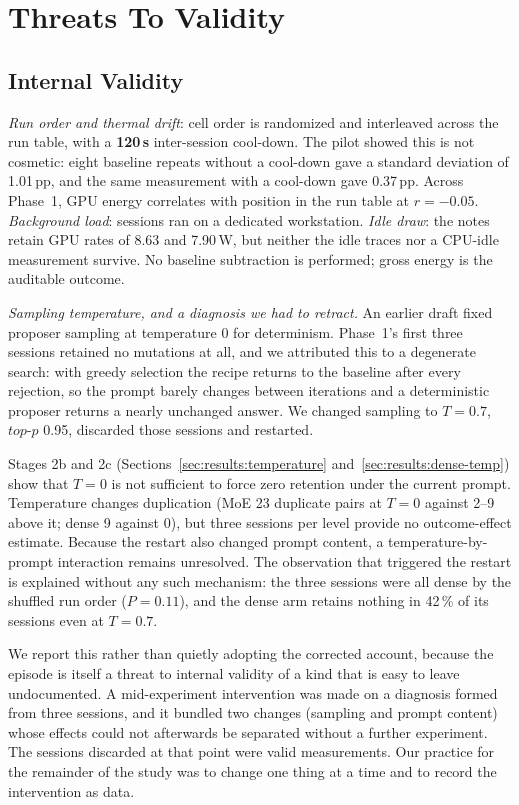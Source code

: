 \section{Threats To Validity}\label{sec:threats}

\subsection{Internal Validity}
\emph{Run order and thermal drift}: cell order is randomized and interleaved across the run table, with a \textbf{120\,s} inter-session cool-down. The pilot showed this is not cosmetic: eight baseline repeats without a cool-down gave a standard deviation of 1.01\,pp, and the same measurement with a cool-down gave 0.37\,pp. Across Phase~1, GPU energy correlates with position in the run table at $r=-0.05$. \emph{Background load}: sessions ran on a dedicated workstation. \emph{Idle draw}: the notes retain GPU rates of 8.63 and 7.90\,W, but neither the idle traces nor a CPU-idle measurement survive. No baseline subtraction is performed; gross energy is the auditable outcome.

\emph{Sampling temperature, and a diagnosis we had to retract.} An earlier draft
fixed proposer sampling at temperature 0 for determinism. Phase~1's first three
sessions retained no mutations at all, and we attributed this to a degenerate
search: with greedy selection the recipe returns to the baseline after every
rejection, so the prompt barely changes between iterations and a deterministic
proposer returns a nearly unchanged answer. We changed sampling to $T=0.7$,
$\mathit{top\text{-}p}$ 0.95, discarded those sessions and restarted.

Stages 2b and 2c (Sections~\ref{sec:results:temperature}
and~\ref{sec:results:dense-temp}) show that $T=0$ is not sufficient to force zero
retention under the current prompt. Temperature changes duplication (MoE 23
duplicate pairs at $T=0$ against 2--9 above it; dense 9 against 0), but three
sessions per level provide no outcome-effect estimate. Because the restart also
changed prompt content, a temperature-by-prompt interaction remains unresolved.
The observation that triggered the restart is explained without any such
mechanism: the three sessions were all dense by the shuffled run order
($P = 0.11$), and the dense arm retains nothing in 42\,\% of its sessions even at
$T=0.7$.

We report this rather than quietly adopting the corrected account, because the
episode is itself a threat to internal validity of a kind that is easy to leave
undocumented. A mid-experiment intervention was made on a diagnosis formed from
three sessions, and it bundled two changes (sampling and prompt content) whose
effects could not afterwards be separated without a further experiment. The
sessions discarded at that point were valid measurements. Our practice for the
remainder of the study was to change one thing at a time and to record the
intervention as data.

